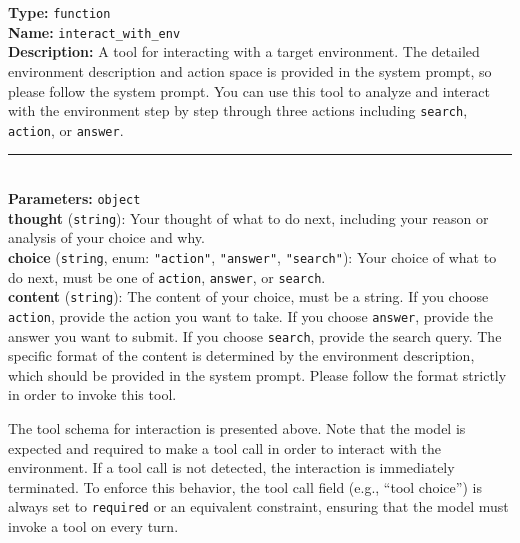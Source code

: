 {\small
\begin{tcolorbox}[colback=gray!5!white, colframe=black!75!black, 
title=Tool Schema: \texttt{interact\_with\_env}, boxrule=0.3mm, width=0.48\textwidth, arc=3mm, auto outer arc=true]

\textbf{Type:} \texttt{function} \\
\textbf{Name:} \texttt{interact\_with\_env} \\
\textbf{Description:} A tool for interacting with a target environment. The detailed environment description and action space is provided in the system prompt, so please follow the system prompt. You can use this tool to analyze and interact with the environment step by step through three actions including \texttt{search}, \texttt{action}, or \texttt{answer}.

\rule{\linewidth}{0.2pt} \\

\textbf{Parameters:} \texttt{object} \\[2mm]
\hspace*{4mm}\textbf{thought} (\texttt{string}):
Your thought of what to do next, including your reason or analysis of your choice and why.\\[2mm]
\hspace*{4mm}\textbf{choice} (\texttt{string}, enum: \texttt{"action"}, \texttt{"answer"}, \texttt{"search"}):
Your choice of what to do next, must be one of \texttt{action}, \texttt{answer}, or \texttt{search}.\\[2mm]
\hspace*{4mm}\textbf{content} (\texttt{string}):
The content of your choice, must be a string.
If you choose \texttt{action}, provide the action you want to take.
If you choose \texttt{answer}, provide the answer you want to submit.
If you choose \texttt{search}, provide the search query.
The specific format of the content is determined by the environment description, which should be provided in the system prompt. Please follow the format strictly in order to invoke this tool.

\end{tcolorbox}
}


The tool schema for interaction is presented above. Note that the model is expected and required to make a tool call in order to interact with the environment. If a tool call is not detected, the interaction is immediately terminated. To enforce this behavior, the tool call field (e.g., ``tool choice'') is always set to \texttt{required} or an equivalent constraint, ensuring that the model must invoke a tool on every turn.

